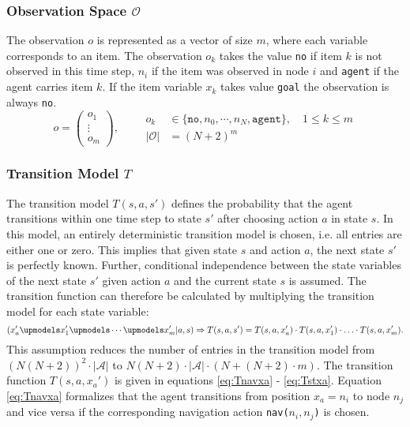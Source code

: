 \subsubsection{Observation Space $\mathcal{O}$}
The observation $o$ is represented as a vector of size $m$, where each variable corresponds to an item. The observation $o_k$ takes the value \texttt{no} if item $k$ is not observed in this time step, $n_i$ if the item was observed in node $i$ and \texttt{agent} if the agent carries item $k$. If the item variable $x_k$ takes value \texttt{goal} the observation is always \texttt{no}.
\begin{equation}
    o = \begin{pmatrix} o_1 \\ \vdots \\ o_m \end{pmatrix}, \qquad \begin{aligned} o_k &\in \{ \texttt{no}, n_0, \cdots, n_N, \texttt{agent} \}, \quad 1 \leq k \leq m\\
    |\mathcal{O}|&= (N+2)^m \end{aligned}
\end{equation}
\subsubsection{Transition Model $T$}
The transition model $T(s, a, s')$ defines the probability that the agent transitions within one time step to state $s'$ after choosing action $a$ in state $s$. In this model, an entirely deterministic transition model is chosen, i.e. all entries are either one or zero. This implies that given state $s$ and action $a$, the next state $s'$ is perfectly known. Further, conditional independence between the state variables of the next state $s'$ given action $a$ and the current state $s$ is assumed. The transition function can therefore be calculated by multiplying the transition model for each state variable:
\begin{equation}
    \left(x_a' \upmodels x_1' \upmodels \cdots \upmodels x_m' |a, s\right) \Rightarrow T(s,a,s') = T(s,a, x_a') \cdot T(s,a,x_1') \cdot \ldots \cdot T(s,a,x_m').
\end{equation}
This assumption reduces the number of entries in the transition model from \\$\left(N(N+2)\right)^2\cdot|\mathcal{A}|$ to $N(N+2)\cdot|\mathcal{A}|\cdot (N+(N+2)\cdot m)$. The transition function $T(s, a, x_a')$ is given in equations \ref{eq:Tnavxa} - \ref{eq:Tstxa}. Equation \ref{eq:Tnavxa} formalizes that the agent transitions from position $x_a=n_i$ to node $n_j$ and vice versa if the corresponding navigation action \texttt{nav($n_i,n_j$)} is chosen.

